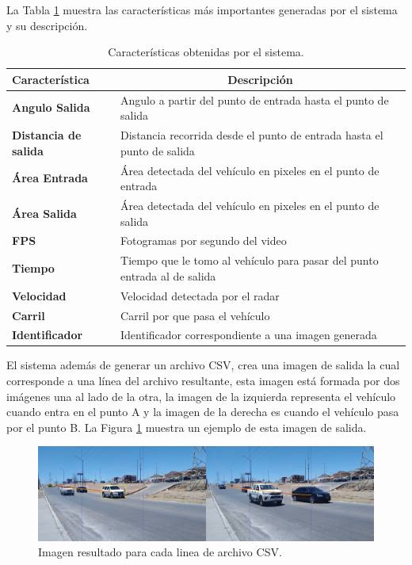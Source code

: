 La Tabla \ref{tab:CaracteristicasSistema} muestra las características más importantes generadas por el sistema y su descripción.

\begin{table}[H]
    \caption{Características obtenidas por el sistema.}
    \label{tab:CaracteristicasSistema}
    \begin{tabular}{|l|l|}
        \hline
        \textbf{Característica} & \multicolumn{1}{c|}{\textbf{Descripción}} \\ \hline
        \textbf{Angulo Salida} & Angulo a partir del punto de entrada hasta el punto de salida \\ \hline
        \textbf{Distancia de salida} & Distancia recorrida desde el punto de entrada hasta el punto de salida \\ \hline
        \textbf{Área Entrada} & Área detectada del vehículo en pixeles en el punto de entrada \\ \hline
        \textbf{Área Salida} & Área detectada del vehículo en pixeles en el punto de salida \\ \hline
        \textbf{FPS} & Fotogramas por segundo del video \\ \hline
        \textbf{Tiempo} & Tiempo que le tomo al vehículo para pasar del punto entrada al de salida \\ \hline
        \textbf{Velocidad} & Velocidad detectada por el radar \\ \hline
        \textbf{Carril} & Carril por que pasa el vehículo \\ \hline
        \textbf{Identificador} & Identificador correspondiente a una imagen generada \\ \hline
    \end{tabular}
\end{table}


El sistema además de generar un archivo CSV, crea una imagen de salida la cual corresponde a una línea del archivo resultante, esta imagen está formada por dos imágenes una al lado de la otra, la imagen de la izquierda representa el vehículo cuando entra en el punto A y la imagen de la derecha es cuando el vehículo pasa por el punto B. La Figura \ref{fig:Completo} muestra un ejemplo de esta imagen de salida.

\begin{figure}[H]
    \centering
    \includegraphics[width=1\textwidth]{Metodologia/imgs/Completo.jpg}
    \caption{Imagen resultado para cada linea de archivo CSV.}
    \label{fig:Completo}
\end{figure}

